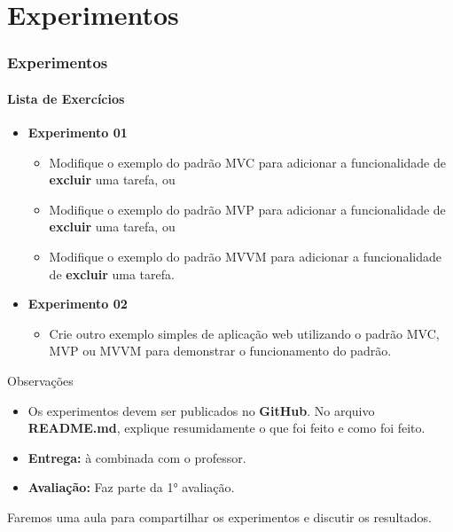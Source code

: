 \documentclass[
	9pt, %
	t, %
]{beamer}
\begin{document}

\section{Experimentos}

\begin{frame}
	\frametitle{Experimentos}
	\framesubtitle{Lista de Exercícios}
	
	\begin{itemize}
		\item \textbf{Experimento 01}
		\begin{itemize}
			\item Modifique o exemplo do padrão MVC para adicionar a funcionalidade de \textbf{excluir} uma tarefa, ou
			\item Modifique o exemplo do padrão MVP para adicionar a funcionalidade de \textbf{excluir} uma tarefa, ou
			\item Modifique o exemplo do padrão MVVM para adicionar a funcionalidade de \textbf{excluir} uma tarefa.
		\end{itemize}
			\item \textbf{Experimento 02}
			\begin{itemize}
				\item Crie outro exemplo simples de aplicação web utilizando o padrão MVC, MVP ou MVVM para demonstrar o funcionamento do padrão.
			\end{itemize}
	\end{itemize}

	\begin{block}{Observações}
		\begin{itemize}
			\item Os experimentos devem ser publicados no \textbf{GitHub}. No arquivo \textbf{README.md}, explique resumidamente o que foi feito e como foi feito.
			\item \textbf{Entrega:} à combinada com o professor.
			\item \textbf{Avaliação:} Faz parte da 1° avaliação.
		\end{itemize}
		\alert{Faremos uma aula para compartilhar os experimentos e discutir os resultados.}
	\end{block}
	
\end{frame}


\end{document}
